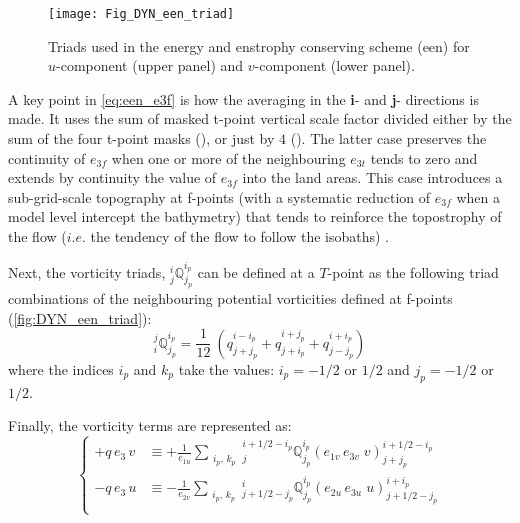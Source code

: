 \documentclass[../tex_main/NEMO_manual]{subfiles}
\begin{document}
\begin{figure}[!ht]    \begin{center}
\texttt{[image: Fig\_DYN\_een\_triad]}
\caption{ \protect\label{fig:DYN_een_triad}  
Triads used in the energy and enstrophy conserving scheme (een) for 
$u$-component (upper panel) and $v$-component (lower panel).}
\end{center}   \end{figure}

A key point in \autoref{eq:een_e3f} is how the averaging in the \textbf{i}- and \textbf{j}- directions is made. 
It uses the sum of masked t-point vertical scale factor divided either 
by the sum of the four t-point masks (), 
or  just by $4$ ().
The latter case preserves the continuity of $e_{3f}$ when one or more of the neighbouring $e_{3t}$ 
tends to zero and extends by continuity the value of $e_{3f}$ into the land areas. 
This case introduces a sub-grid-scale topography at f-points (with a systematic reduction of $e_{3f}$ 
when a model level intercept the bathymetry) that tends to reinforce the topostrophy of the flow 
($i.e.$ the tendency of the flow to follow the isobaths) \citep{Penduff_al_OS07}. 

Next, the vorticity triads, $ {^i_j}\mathbb{Q}^{i_p}_{j_p}$ can be defined at a $T$-point as 
the following triad combinations of the neighbouring potential vorticities defined at f-points 
(\autoref{fig:DYN_een_triad}): 
\begin{equation} \label{eq:Q_triads}
_i^j \mathbb{Q}^{i_p}_{j_p}
= \frac{1}{12} \ \left(   q^{i-i_p}_{j+j_p} + q^{i+j_p}_{j+i_p} + q^{i+i_p}_{j-j_p}  \right)
\end{equation}
where the indices $i_p$ and $k_p$ take the values: $i_p = -1/2$ or $1/2$ and $j_p = -1/2$ or $1/2$. 

Finally, the vorticity terms are represented as: 
\begin{equation} \label{eq:dynvor_een}
\left\{ {
\begin{aligned}
 +q\,e_3 \, v 	&\equiv +\frac{1}{e_{1u} }   \sum_{\substack{i_p,\,k_p}} 
                         {^{i+1/2-i_p}_j}  \mathbb{Q}^{i_p}_{j_p}  \left( e_{1v}\,e_{3v} \;v  \right)^{i+1/2-i_p}_{j+j_p}   \\
 - q\,e_3 \, u     &\equiv -\frac{1}{e_{2v} }    \sum_{\substack{i_p,\,k_p}} 
                         {^i_{j+1/2-j_p}}  \mathbb{Q}^{i_p}_{j_p}  \left( e_{2u}\,e_{3u} \;u  \right)^{i+i_p}_{j+1/2-j_p}   \\
\end{aligned} 
} \right.
\end{equation} 
\end{document}
